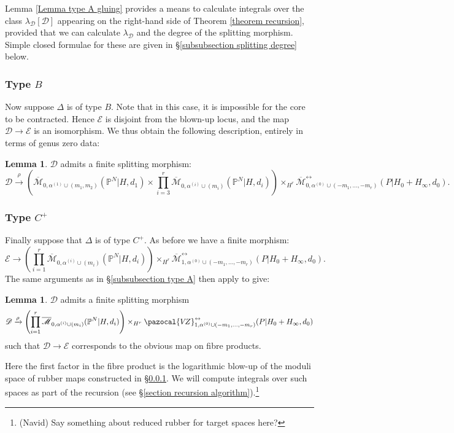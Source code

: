 \documentclass[11pt]{amsart}
\newcommand{\PP}{\mathbb P}
\newcommand{\VZ}{\pazocal{V\!Z}}
\renewcommand{\to}{\rightarrow}
\newcommand{\Mcal}{\mathcal{M}}
\newcommand{\Dcal}{\mathcal{D}}
\newcommand{\Ecal}{\mathcal{E}}
\newcommand{\ol}[1]{\overline{#1}}
\theoremstyle{definition}
\newtheorem{lemma}[thm]{Lemma}
\theoremstyle{definition}
\begin{document}
Lemma \ref{Lemma type A gluing} provides a means to calculate integrals over the class $\lambda_\Dcal[\Dcal]$ appearing on the right-hand side of Theorem \ref{theorem recursion}, provided that we can calculate $\lambda_\Dcal$ and the degree of the splitting morphism. Simple closed formulae for these are given in \S \ref{subsubsection splitting degree} below.

\subsubsection{Type $B$}
Now suppose $\Delta$ is of type $B$. Note that in this case, it is impossible for the core to be contracted. Hence $\Ecal$ is disjoint from the blown-up locus, and the map $\Dcal \to \Ecal$ is an isomorphism. We thus obtain the following description, entirely in terms of genus zero data:
\begin{lemma} $\Dcal$ admits a finite splitting morphism:
\begin{equation*} \Dcal \xrightarrow{\rho} \left(\ol\Mcal_{0,\alpha^{(1)}\cup(m_1,m_2)}(\PP^N|H,d_1)\times\prod_{i=3}^r \ol\Mcal_{0,\alpha^{(i)}\cup(m_i)}(\PP^N|H,d_i)\right) \times_{H^r} \ol\Mcal^{\leftrightarrow}_{0,\alpha^{(0)}\cup(-m_1,\ldots,-m_r)}(P|H_0+H_\infty,d_0).\end{equation*}\end{lemma}

\subsubsection{Type $C^+$} \label{subsubsection type C+} Finally suppose that $\Delta$ is of type $C^+$. As before we have a finite morphism:
\begin{equation*} \Ecal \to  \left( \prod_{i=1}^r \ol\Mcal_{0,\alpha^{(i)}\cup(m_i)}(\PP^N|H,d_i) \right) \times_{H^r} \ol\Mcal^{\leftrightarrow}_{1,\alpha^{(0)}\cup(-m_1,\ldots,-m_r)}(P|H_0+H_\infty,d_0). \end{equation*}
The same arguments as in \S \ref{subsubsection type A} then apply to give:
\begin{lemma} $\Dcal$ admits a finite splitting morphism
\begin{equation*}\Dcal \xrightarrow{\rho} \left( \prod_{i=1}^r \ol\Mcal_{0,\alpha^{(i)}\cup(m_i)}(\PP^N|H,d_i) \right) \times_{H^r} \VZ^{\leftrightarrow}_{1,\alpha^{(0)}\cup(-m_1,\ldots,-m_r)}(P|H_0+H_\infty,d_0)\end{equation*}
such that $\Dcal \to \Ecal$ corresponds to the obvious map on fibre products.\end{lemma}
Here the first factor in the fibre product is the logarithmic blow-up of the moduli space of rubber maps constructed in \S \ref{}. We will compute integrals over such spaces as part of the recursion (see \S \ref{section recursion algorithm}).\footnote{(Navid) Say something about reduced rubber for target spaces here?}
\end{document}
